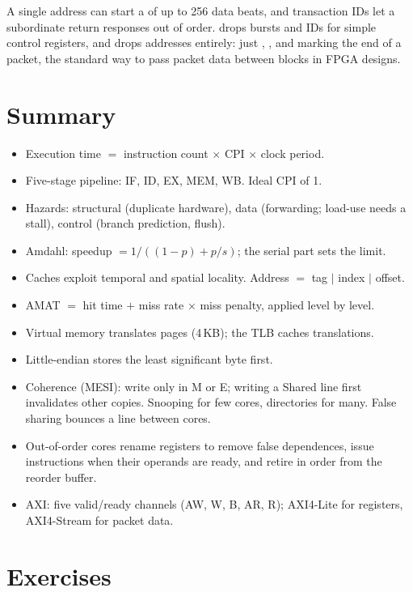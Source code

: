A single address can start a  of up to 256 data beats, and transaction IDs let a subordinate return responses out of order.  drops bursts and IDs for simple control registers, and  drops addresses entirely: just , ,  and  marking the end of a packet, the standard way to pass packet data between blocks in FPGA designs.

\section{Summary}

\begin{itemize}
  \item Execution time $=$ instruction count $\times$ CPI $\times$ clock period.
  \item Five-stage pipeline: IF, ID, EX, MEM, WB. Ideal CPI of 1.
  \item Hazards: structural (duplicate hardware), data (forwarding; load-use needs a stall), control (branch prediction, flush).
  \item Amdahl: speedup $= 1/((1-p) + p/s)$; the serial part sets the limit.
  \item Caches exploit temporal and spatial locality. Address $=$ tag $|$ index $|$ offset.
  \item AMAT $=$ hit time $+$ miss rate $\times$ miss penalty, applied level by level.
  \item Virtual memory translates pages (4\,KB); the TLB caches translations.
  \item Little-endian stores the least significant byte first.
  \item Coherence (MESI): write only in M or E; writing a Shared line first invalidates other copies. Snooping for few cores, directories for many. False sharing bounces a line between cores.
  \item Out-of-order cores rename registers to remove false dependences, issue instructions when their operands are ready, and retire in order from the reorder buffer.
  \item AXI: five valid/ready channels (AW, W, B, AR, R); AXI4-Lite for registers, AXI4-Stream for packet data.
\end{itemize}

\section{Exercises}

